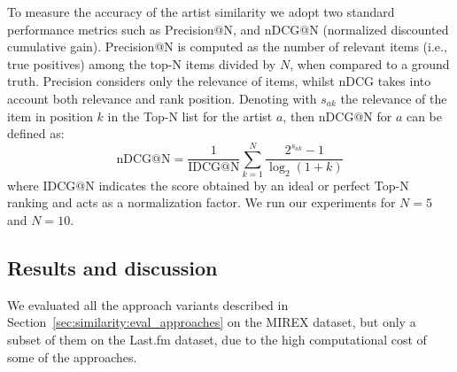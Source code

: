 To measure the accuracy of the artist similarity we adopt two standard performance metrics such as Precision@N, and nDCG@N (normalized discounted cumulative gain).
Precision@N is computed as the number of relevant items (i.e., true positives) among the top-N items divided by $N$, when compared to a ground truth.
Precision considers only the relevance of items, whilst nDCG takes into account both relevance and rank position. Denoting with  $s_{ak}$ the relevance of the item in position $k$ in the Top-N list for the artist $a$, then nDCG@N for $a$ can be defined as:
\begin{equation}\label{eq:recall}
\text{nDCG@N} = \frac{1 }{\text{IDCG@N}} \sum^N_{k=1} \frac{ 2^{ s_{ak}} -1 }{\log_2 (1+k)}
\end{equation}
where IDCG@N indicates the score obtained by an ideal or perfect Top-N ranking and acts as a normalization factor. We run our experiments for $N=5$ and $N=10$.

\subsection{Results and discussion}
\label{sec:similarity:results}

We evaluated all the approach variants described in Section~\ref{sec:similarity:eval_approaches} on the MIREX dataset, but only a subset of them on the Last.fm dataset, due to the high computational cost of some of the approaches.

